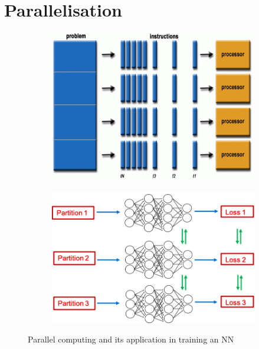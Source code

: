 \section{Parallelisation}

\begin{figure}[!h]
        \begin{center}
	\begin{subfigure}{0.45\linewidth}
		\centering
		\includegraphics[width=\linewidth]{parallel_fig/parallel1.png}
	\end{subfigure}
	\begin{subfigure}{0.45\linewidth}
		\centering
		\includegraphics[width=\linewidth]{parallel_fig/parallel2.png}
	\end{subfigure}
	\caption{Parallel computing and its application in training an NN}
	\label{fig: parallel}
        \end{center}
\end{figure}

